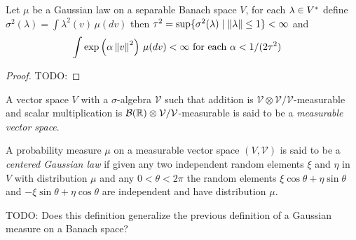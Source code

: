 \begin{thm}Let $\mu$ be a Gaussian law on a separable Banach space $V$, for each $\lambda \in {V}^*$ define $\sigma^2(\lambda) = \int \lambda^2(v) \, \mu(dv)$ then $\tau^2 = \sup \lbrace \sigma^2(\lambda) \mid \left \lVert \lambda \right \rVert \leq 1 \rbrace < \infty$ and 
\begin{align*}
\int \exp\left( \alpha \left \lVert v \right \rVert^2 \right) \, \mu(dv) &< \infty \text{ for each $\alpha < 1/(2\tau^2)$}
\end{align*}
\end{thm}
\begin{proof}
TODO:
\end{proof}

\begin{defn}A vector space $V$ with a $\sigma$-algebra $\mathcal{V}$ such that addition is $\mathcal{V} \otimes \mathcal{V}/\mathcal{V}$-measurable and scalar multiplication is 
$\mathcal{B}(\mathbb{R}) \otimes \mathcal{V} / \mathcal{V}$-measurable is said to be a \emph{measurable vector space}.
\end{defn}

\begin{defn}A probability measure $\mu$ on a measurable vector space $(V, \mathcal{V})$ is said to be a \emph{centered Gaussian law} if given any two independent random elements $\xi$ and $\eta$ in $V$ with distribution $\mu$ and any $0 < \theta < 2\pi$ the random elements $\xi \cos \theta + \eta \sin \theta$ and $- \xi \sin \theta + \eta \cos \theta$ are independent and have distribution $\mu$.
\end{defn}

TODO: Does this definition generalize the previous definition of a Gaussian measure on a Banach space?

